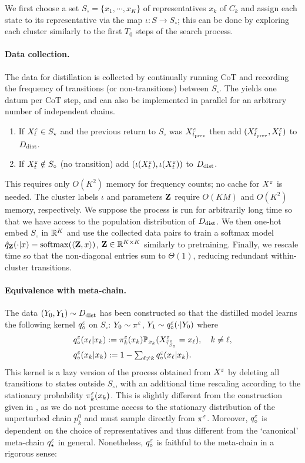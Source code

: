 We first choose a set $S_\circ=\{x_1,\cdots,x_K\}$ of representatives $x_k$ of $C_k$ and assign each state to its representative via the map $\iota: S\to S_\circ$; this can be done by exploring each cluster similarly to the first $T_0$ steps of the search process.

\paragraph{Data collection.} The data for distillation is collected by continually running CoT and recording the frequency of transitions (or non-transitions) between $S_\circ$. The yields one datum per CoT step, and can also be implemented in parallel for an arbitrary number of independent chains.
\begin{enumerate}
\item If $X_t^\varepsilon \in S_\star$ and the previous return to $S_\circ$ was $X_{t_{\operatorname{prev}}}^\varepsilon$ then add $(X_{t_{\operatorname{prev}}}^\varepsilon,X_t^\varepsilon)$ to $D_{\operatorname{dist}}$.
\item If $X_t^\varepsilon \notin S_\circ$ (no transition) add $(\iota(X_t^\varepsilon), \iota(X_t^\varepsilon))$ to $D_{\operatorname{dist}}$.
\end{enumerate}
This requires only $O(K^2)$ memory for frequency counts; no cache for $X^\varepsilon$ is needed. The cluster labels $\iota$ and parameters $\mathbf{Z}$ require $O(KM)$ and $O(K^2)$ memory, respectively. We suppose the process is run for arbitrarily long time so that we have access to the population distribution of $D_{\operatorname{dist}}$. We then one-hot embed $S_\circ$ in $\mathbb{R}^K$ and use the collected data pairs to train a softmax model $\hat{q}_{\mathbf{Z}}(\cdot|x) = \operatorname{softmax}(\langle\mathbf{Z},x\rangle)$, $\mathbf{Z}\in\mathbb{R}^{K\times K}$ similarly to pretraining. Finally, we rescale time so that the non-diagonal entries sum to $\Theta(1)$, reducing redundant within-cluster transitions.

\paragraph{Equivalence with meta-chain.} The data $(Y_0,Y_1)\sim D_{\operatorname{dist}}$ has been constructed so that the distilled model learns the following kernel $q_\circ^\varepsilon$ on $S_\circ$: $Y_0\sim\pi^\varepsilon$, $Y_1\sim q_\circ^\varepsilon(\cdot|Y_0)$ where
\begin{align*}
&q_\circ^\varepsilon(x_\ell|x_k) := \pi_k^\varepsilon(x_k)\mathbb{P}_{x_k}(X_{\bar{\tau}_{S_\circ}^\varepsilon}^\varepsilon = x_\ell), \quad k\neq\ell,\\
&q_\circ^\varepsilon(x_k|x_k) := 1-\textstyle\sum_{\ell\ne k} q_\circ^\varepsilon(x_\ell|x_k).
\end{align*}
This kernel is a lazy version of the process obtained from $X^\varepsilon$ by deleting all transitions to states outside $S_\circ$, with an additional time rescaling according to the stationary probability $\pi_k^\varepsilon(x_k)$. This is slightly different from the construction given in \citet{Betz16}, as we do not presume access to the stationary distribution of the unperturbed chain $p_k^0$ and must sample directly from $\pi^\varepsilon$. Moreover, $q_\circ^\varepsilon$ is dependent on the choice of representatives and thus different from the `canonical' meta-chain $q_\star^\varepsilon$ in general. Nonetheless, $q_\circ^\varepsilon$ is faithful to the meta-chain in a rigorous sense:

